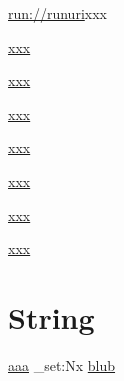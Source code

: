 \documentclass{article}
\begin{document}
\url{run://runuri}{xxx}

\href{:emptyprefixGoToR}{xxx}

\href{file:fileprefixGoToR}{xxx}

\href{run:runprefixLaunch}{xxx}

\href{blub:blubprefixURI}{xxx}

\href{nocolonnodotGoToR}{xxx}

\href{colonURI.dot}{xxx}

\href{colonGoToR.pdf}{xxx}


\section{String}

\def\blub{file://www.teststrings.de}
\href{\blub}{aaa}
\ExplSyntaxOn %
\str_set:Nx
\href{\ltmpastr}{blub}
\ExplSyntaxOff
\end{document}
